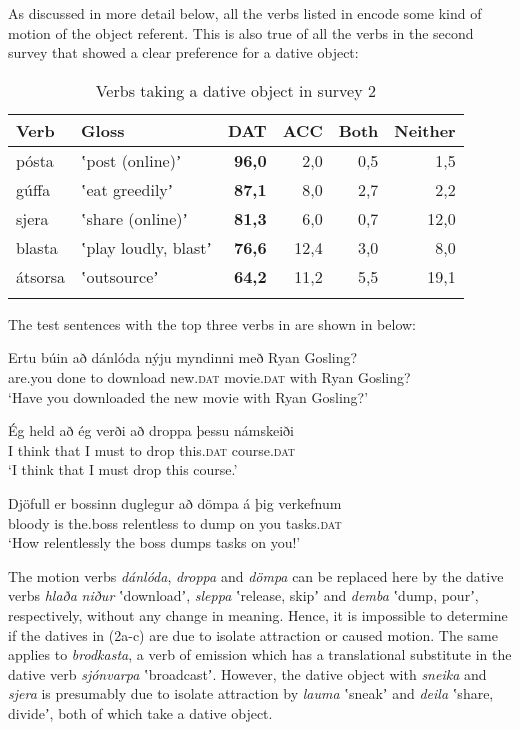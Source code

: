 \documentclass[output=paper,modfonts,nonflat,colorlinks,citecolor=brown]{langsci/langscibook}
\begin{document}
As discussed in more detail below, all the verbs listed in  encode some kind of motion of the object referent. This is also true of all the verbs in the second survey that showed a clear preference for a dative object:

\begin{table}
{\caption{\label{tab:jonsson:2}Verbs taking a dative object in survey 2}}
\begin{tabularx}{\textwidth}{XXrrrr}
\lsptoprule
Verb & Gloss & \textbf{DAT} & ACC & Both & Neither\\
\midrule
pósta & ʽpost (online)ʼ & \textbf{96,0} & 2,0 & 0,5 & 1,5\\
gúffa & ʽeat greedilyʼ & \textbf{87,1} & 8,0 & 2,7 & 2,2\\
sjera & ʽshare (online)ʼ & \textbf{81,3} & 6,0 & 0,7 & 12,0\\
blasta & ʽplay loudly, blastʼ & \textbf{76,6} & 12,4 & 3,0 & 8,0\\
átsorsa & ʽoutsourceʼ & \textbf{64,2} & 11,2 & 5,5 & 19,1\\
\lspbottomrule
\end{tabularx}
\end{table}

The test sentences with the top three verbs in  are shown in  below:


\ea%
    \label{ex:jonsson:2}

\ea
\gll  Ertu  búin  að  dánlóda  nýju  myndinni  með  Ryan  Gosling?\\
   are.you  done  to  download  new.\textsc{dat}  movie.\textsc{dat}  with  Ryan  Gosling?\\
\glt `Have you downloaded the new movie with Ryan Gosling?'
 

\ex
\gll   Ég  held  að  ég  verði  að  droppa  þessu  námskeiði\\
 I  think  that  I  must  to  drop  this.\textsc{dat}  course.\textsc{dat}\\
\glt `I think that I must drop this course.'
 

\ex
\gll   Djöfull  er  bossinn  duglegur  að  dömpa  á  þig  verkefnum\\
 bloody  is  the.boss  relentless  to  dump  on  you  tasks.\textsc{dat}\\
\glt `How relentlessly the boss dumps tasks on you!'
\z
\z

The motion verbs \textit{dánlóda}, \textit{droppa} and \textit{dömpa} can be replaced here by the dative verbs \textit{hlaða} \textit{niður} ʽdownloadʼ, \textit{sleppa} ʽrelease, skipʼ and \textit{demba} ʽdump, pourʼ, respectively, without any change in meaning.\textstyleFootnoteSymbol{} Hence, it is impossible to determine if the datives in (2a-c) are due to isolate attraction or caused motion. The same applies to \textit{brodkasta}, a verb of emission which has a translational substitute in the dative verb \textit{sjónvarpa} ʽbroadcastʼ. However, the dative object with \textit{sneika} and \textit{sjera} is presumably due to isolate attraction by \textit{lauma} ʽsneakʼ and \textit{deila} ʽshare, divideʼ, both of which take a dative object.
\end{document}
